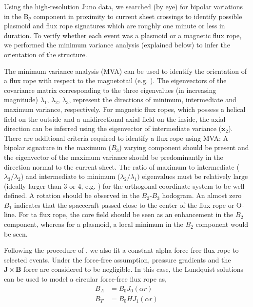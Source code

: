Using the high-resolution Juno data, we searched (by eye) for bipolar variations in the B$_\theta$ component in proximity to current sheet crossings to identify possible plasmoid and flux rope signatures which are roughly one minute or less in duration. To verify whether each event was a plasmoid or a magnetic flux rope, we performed the minimum variance analysis (explained below) to infer the orientation of the structure.

The minimum variance analysis (MVA) can be used to identify the orientation of a flux rope with respect to the magnetotail (e.g. \cite{Sonnerup1967MagnetopauseObservations}). The eigenvectors of the covariance matrix corresponding to the three eigenvalues (in increasing magnitude) $\lambda_1$, $\lambda_2$, $\lambda_3$, represent the directions of minimum, intermediate and maximum variance, respectively. For magnetic flux ropes, which possess a helical field on the outside and a unidirectional axial field on the inside, the axial direction can be inferred using the eigenvector of intermediate variance ($\mathbf{x}_2$). There are additional criteria required to identify a flux rope using MVA: A bipolar signature in the maximum ($B_3$) varying component should be present and the eigenvector of the maximum variance should be predominantly in the direction normal to the current sheet. The ratio of maximum to intermediate ($\lambda_3/\lambda_2$) and intermediate to minimum ($\lambda_2/\lambda_1)$ eigenvalues must be relatively large (ideally larger than 3 or 4, e.g. ) for the orthogonal coordinate system to be well-defined. A rotation should be observed in the $B_2$-$B_3$ hodogram. An almost zero $B_1$ indicates that the spacecraft passed close to the center of the flux rope or O-line. For ta flux rope, the core field should be seen as an enhancement in the $B_2$ component, whereas for a plasmoid, a local minimum in the $B_2$ component would be seen.

Following the procedure of \cite{Lepping1990MagneticAU}, we also fit a constant alpha force free flux rope to selected events. Under the force-free assumption, pressure gradients and the $\mathbf{J}\times\mathbf{B}$ force are considered to be negligible. In this case, the Lundquist solutions can be used to model a circular force-free flux rope \cite{Lepping1990MagneticAU,Slavin2003GeotailSheet} as, 
\begin{align}
    B_A & = B_0 J_0 (\alpha r) \\
    B_T & = B_0 H J_1 (\alpha r)
\end{align}

